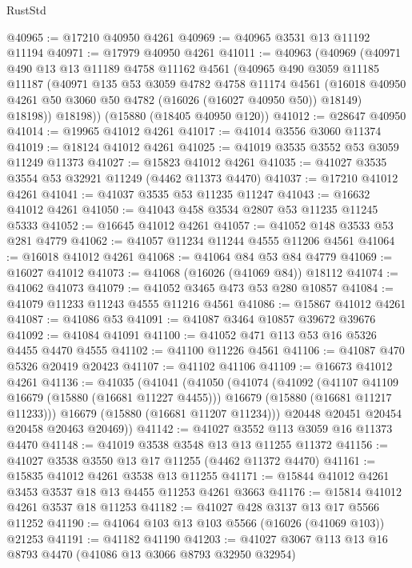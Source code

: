 \begin{lexlean}{RustStd}
\begin{coremodule}
@40965 := @17210 @40950 @4261
@40969 := @40965 @3531 @13 @11192 @11194
@40971 := @17979 @40950 @4261
@41011 := @40963
    (@40969
      (@40971
        @490
        @13
        @13
        @11189
        @4758
        @11162
        @4561
        (@40965
          @490
          @3059
          @11185
          @11187
          (@40971
            @135
            @53
            @3059
            @4782
            @4758
            @11174
            @4561
            (@16018 @40950 @4261 @50 @3060 @50 @4782 (@16026 (@16027 @40950 @50)) @18149)
            @18198))
        @18198))
    (@15880 (@18405 @40950 @120))
@41012 := @28647 @40950
@41014 := @19965 @41012 @4261
@41017 := @41014 @3556 @3060 @11374
@41019 := @18124 @41012 @4261
@41025 := @41019 @3535 @3552 @53 @3059 @11249 @11373
@41027 := @15823 @41012 @4261
@41035 := @41027 @3535 @3554 @53 @32921 @11249 (@4462 @11373 @4470)
@41037 := @17210 @41012 @4261
@41041 := @41037 @3535 @53 @11235 @11247
@41043 := @16632 @41012 @4261
@41050 := @41043 @458 @3534 @2807 @53 @11235 @11245 @5333
@41052 := @16645 @41012 @4261
@41057 := @41052 @148 @3533 @53 @281 @4779
@41062 := @41057 @11234 @11244 @4555 @11206 @4561
@41064 := @16018 @41012 @4261
@41068 := @41064 @84 @53 @84 @4779
@41069 := @16027 @41012
@41073 := @41068 (@16026 (@41069 @84)) @18112
@41074 := @41062 @41073
@41079 := @41052 @3465 @473 @53 @280 @10857
@41084 := @41079 @11233 @11243 @4555 @11216 @4561
@41086 := @15867 @41012 @4261
@41087 := @41086 @53
@41091 := @41087 @3464 @10857 @39672 @39676
@41092 := @41084 @41091
@41100 := @41052 @471 @113 @53 @16 @5326 @4455 @4470 @4555
@41102 := @41100 @11226 @4561
@41106 := @41087 @470 @5326 @20419 @20423
@41107 := @41102 @41106
@41109 := @16673 @41012 @4261
@41136 := @41035
    (@41041
      (@41050
        (@41074
          (@41092
            (@41107 @41109 @16679 (@15880 (@16681 @11227 @4455)))
            @16679
            (@15880 (@16681 @11217 @11233)))
          @16679
          (@15880 (@16681 @11207 @11234)))
        @20448
        @20451
        @20454
        @20458
        @20463
        @20469))
@41142 := @41027 @3552 @113 @3059 @16 @11373 @4470
@41148 := @41019 @3538 @3548 @13 @13 @11255 @11372
@41156 := @41027 @3538 @3550 @13 @17 @11255 (@4462 @11372 @4470)
@41161 := @15835 @41012 @4261 @3538 @13 @11255
@41171 := @15844 @41012 @4261 @3453 @3537 @18 @13 @4455 @11253 @4261 @3663
@41176 := @15814 @41012 @4261 @3537 @18 @11253
@41182 := @41027 @428 @3137 @13 @17 @5566 @11252
@41190 := @41064 @103 @13 @103 @5566 (@16026 (@41069 @103)) @21253
@41191 := @41182 @41190
@41203 := @41027 @3067 @113 @13 @16 @8793 @4470 (@41086 @13 @3066 @8793 @32950 @32954)

\end{coremodule}
\end{lexlean}
